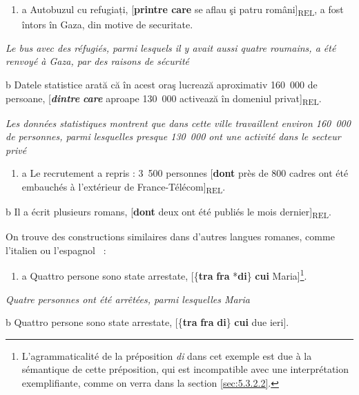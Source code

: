 \begin{enumerate}
\item \label{bkm:Ref292718532}a  Autobuzul cu refugiați, [\textbf{printre care} se aflau şi patru români]\textsubscript{REL}, a fost întors în Gaza, din motive de securitate. 


\end{enumerate}
{\itshape
Le bus avec des réfugiés, parmi lesquels il y avait aussi quatre roumains, a été renvoyé à Gaza, par des raisons de sécurité}

  b  Datele statistice arată că în acest oraş lucrează aproximativ 160~000 de persoane, [\emph{\textbf{\textup{dintre}}}\emph{\textbf{} }\emph{\textbf{\textup{care}}} aproape 130~000 activează în domeniul privat]\textsubscript{REL}.

{\itshape
Les données statistiques montrent que dans cette ville travaillent environ 160~000 de personnes, parmi lesquelles presque 130~000 ont une activité dans le secteur privé}


\begin{enumerate}
\item \label{bkm:Ref292718535}a  Le recrutement a repris : 3~500 personnes [\textbf{dont} près de 800 cadres ont été embauchés  à l'extérieur de  France-Télécom]\textsubscript{REL}.


\end{enumerate}
  b  Il a écrit plusieurs romans, [\textbf{dont} deux ont été publiés le mois dernier]\textsubscript{REL}.

On trouve des constructions similaires dans d'autres langues romanes, comme l'italien  ou l'espagnol~ :


\begin{enumerate}
\item \label{bkm:Ref292827451}a  Quattro persone sono state arrestate, [\{\textbf{tra} {\textbar} \textbf{fra} {\textbar} *\textbf{di}\} \textbf{cui} Maria]\footnote{L'agrammaticalité de la préposition \textit{di} dans cet exemple est due à la sémantique de cette préposition, qui est incompatible avec une interprétation exemplifiante, comme on verra dans la section \ref{sec:5.3.2.2}.}. 


\end{enumerate}
{\itshape
Quatre personnes ont été arrêtées, parmi lesquelles Maria}

  b  Quattro persone sono state arrestate, [\{\textbf{tra} {\textbar} \textbf{fra} {\textbar} \textbf{di}\} \textbf{cui} due ieri].

